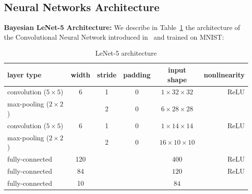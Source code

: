 \documentclass{article}
\begin{document}
 \subsection{Neural Networks Architecture}
 
 \textbf{Bayesian LeNet-5 Architecture:}
We describe in Table~\ref{table:lenet} the architecture of the Convolutional Neural Network introduced in~\cite{lecun1998gradient} and trained on MNIST:
\begin{table}[H]
\begin{center}
\begin{tabular}{ l c c c c r}
  \hline
  layer type & width & stride& padding & input shape& nonlinearity \\
  \hline
convolution ($5 \times 5$) & 6 & 1 & 0 & $1 \times 32 \times 32$ & ReLU \\
max-pooling ($2 \times 2$) &  & 2 & 0 & $6 \times 28 \times 28$ & \\
convolution ($5 \times 5$) & 6 & 1 & 0 & $1 \times 14 \times 14$ & ReLU \\
max-pooling ($2 \times 2$) &  & 2 & 0 & $16 \times 10 \times 10$ & \\
fully-connected & 120 &  &  & $400$ & ReLU \\
fully-connected & 84 &  &  & $ 120$ & ReLU \\
fully-connected & 10 &  &  & $ 84$ &  \\
  \hline
\end{tabular}
    \caption{LeNet-5 architecture}    \label{table:lenet}
\end{center}
\end{table}
\end{document}
